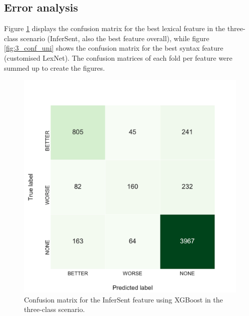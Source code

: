 \FloatBarrier
\subsection{Error analysis}
\label{sec:error_analysis}
Figure \ref{fig:3_conf_inf} displays the confusion matrix for the best lexical feature in the three-class scenario (InferSent, also the best feature overall), while figure \ref{fig:3_conf_uni} shows the confusion matrix for the best syntax feature (customised LexNet).
 The confusion matrices of each fold per feature were summed up to create the figures.



\begin{figure}[h]
    \begin{minipage}{.5\linewidth}
   \caption{Confusion matrix for the InferSent feature using XGBoost in the three-class scenario.} 
    \label{fig:3_conf_inf}
 \centering
	\includegraphics[width=1\linewidth]{images/experiments/conf-InferSent_False}
  \end{minipage} \hfill
    \begin{minipage}{.5\linewidth}
  

\end{minipage}
\end{figure}
